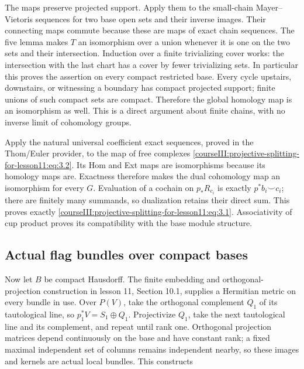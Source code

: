 The maps preserve projected support. Apply them to the small-chain Mayer--Vietoris sequences for two base open sets and their inverse images. Their connecting maps commute because these are maps of exact chain sequences. The five lemma makes \(T\) an isomorphism over a union whenever it is one on the two sets and their intersection. Induction over a finite trivializing cover works: the intersection with the last chart has a cover by fewer trivializing sets. In particular this proves the assertion on every compact restricted base. Every cycle upstairs, downstairs, or witnessing a boundary has compact projected support; finite unions of such compact sets are compact. Therefore the global homology map is an isomorphism as well. This is a direct argument about finite chains, with no inverse limit of cohomology groups.

Apply the natural universal coefficient exact sequences, proved in the Thom/Euler provider, to the map of free complexes \eqref{courseIII:projective-splitting-for-lesson11:eq:3.2}. Its Hom and Ext maps are isomorphisms because its homology maps are. Exactness therefore makes the dual cohomology map an isomorphism for every \(G\). Evaluation of a cochain on \(p_*R_{c_i}\) is exactly \(p^*b_i\smile c_i\); there are finitely many summands, so dualization retains their direct sum. This proves exactly \eqref{courseIII:projective-splitting-for-lesson11:eq:3.1}. Associativity of cup product proves its compatibility with the base module structure.

\subsection{Actual flag bundles over compact bases}
\label{courseIII:projective-splitting-for-lesson11:integral-flag-map}

\label{courseIII:projective-splitting-for-lesson11:section-4}\label{courseIII:projective-splitting-for-lesson11:CG-S6-PROJECTIVE-4}

Now let \(B\) be compact Hausdorff. The finite embedding and orthogonal-projection construction in lesson 11, Section 10.1, supplies a Hermitian metric on every bundle in use. Over \(P(V)\), take the orthogonal complement \(Q_1\) of its tautological line, so \(p_1^*V=S_1\oplus Q_1\). Projectivize \(Q_1\), take the next tautological line and its complement, and repeat until rank one. Orthogonal projection matrices depend continuously on the base and have constant rank; a fixed maximal independent set of columns remains independent nearby, so these images and kernels are actual local bundles. This constructs

